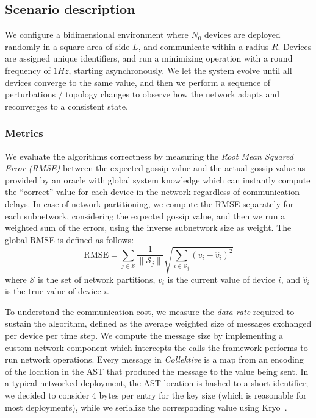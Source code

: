 \documentclass[runningheads]{llncs}
\newcommand{\ck}{\emph{Collektive}}
\begin{document}
\subsection{Scenario description}\label{subsec:scenario-description}

We configure a bidimensional environment where $N_0$ devices are deployed randomly in a square area of side $L$,
and communicate within a radius $R$.
%
Devices are assigned unique identifiers,
and run a minimizing operation with a round frequency of $1Hz$, starting asynchronously.
%
We let the system evolve until all devices converge to the same value,
and then we perform a sequence of perturbations / topology changes to observe how the network adapts and reconverges to a consistent state.

\subsubsection{Metrics}\label{subsubsec:metrics}
We evaluate the algorithms correctness by measuring the \emph{Root Mean Squared Error (RMSE)}
between the expected gossip value and the actual gossip value as provided by an oracle
with global system knowledge which can instantly compute the ``correct'' value
for each device in the network regardless of communication delays.
%
In case of network partitioning, we compute the RMSE separately for each subnetwork,
considering the expected gossip value, and then we run a weighted sum of the errors,
using the inverse subnetwork size as weight.
%
The global RMSE is defined as follows:
\begin{equation*}
    \text{RMSE} = \sum_{j \in \mathcal{S}} \frac{1}{\|\mathcal{S}_j\|} \sqrt{\sum_{i \in \mathcal{S}_j} (v_i - \hat{v}_i)^2}
\end{equation*}
where $\mathcal{S}$ is the set of network partitions,
$v_i$ is the current value of device $i$,
and $\hat{v}_i$ is the true value of device $i$.

To understand the communication cost,
we measure the \emph{data rate} required to sustain the algorithm,
defined as the average weighted size of messages exchanged per device per time step.
%
We compute the message size by implementing a custom network component which intercepts the calls the framework performs to
run network operations.
%
Every message in \ck{} is a map from an encoding of the location in the \ac{AST} that produced the message to the value being sent.
%
In a typical networked deployment, the \ac{AST} location is hashed to a short identifier;
we decided to consider 4 bytes per entry for the key size (which is reasonable for most deployments),
while we serialize the corresponding value using Kryo~\cite{DBLP:conf/usenix/TaranovBAH21}.
\end{document}
